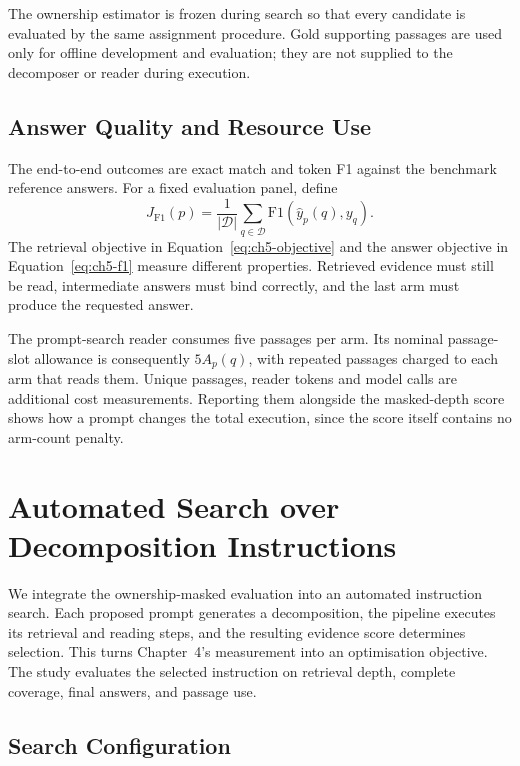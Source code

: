 The ownership estimator is frozen during search so that every candidate is
evaluated by the same assignment procedure. Gold supporting passages are used only 
for offline development and evaluation; they are not supplied to the decomposer or reader during execution.

\subsection{Answer Quality and Resource Use}

The end-to-end outcomes are exact match and token F1 against the benchmark
reference answers. For a fixed evaluation panel, define
\begin{equation}
  J_{\mathrm{F1}}(p)=\frac{1}{|\mathcal D|}
       \sum_{q\in\mathcal D}\mathrm{F1}(\widehat y_p(q),y_q).
  \label{eq:ch5-f1}
\end{equation}
The retrieval objective in Equation~\ref{eq:ch5-objective} and the answer
objective in Equation~\ref{eq:ch5-f1} measure different properties. Retrieved
evidence must still be read, intermediate answers must bind correctly, and the
last arm must produce the requested answer.

The prompt-search reader consumes five passages per arm. Its nominal passage-slot
allowance is consequently $5A_p(q)$, with repeated passages charged to each
arm that reads them. Unique passages, reader tokens and model calls are
additional cost measurements. Reporting them alongside the masked-depth score
shows how a prompt changes the total execution, since the score itself
contains no arm-count penalty.

\section{Automated Search over Decomposition Instructions}
\label{sec:ch5-prompt-search}

We integrate the ownership-masked evaluation into an automated instruction
search. Each proposed prompt generates a decomposition, the pipeline executes
its retrieval and reading steps, and the resulting evidence score determines
selection. This turns Chapter~4's measurement into an optimisation objective.
The study evaluates the selected instruction on retrieval depth, complete
coverage, final answers, and passage use.

\subsection{Search Configuration}

